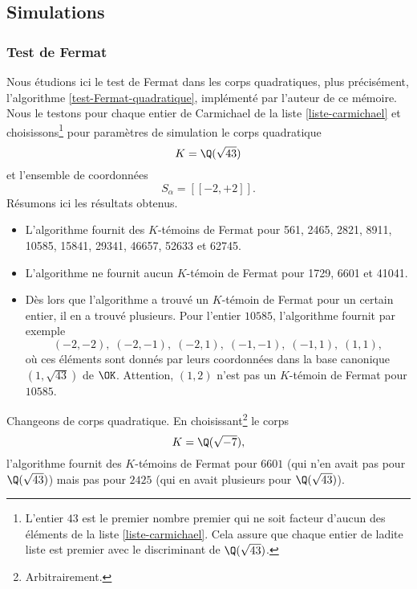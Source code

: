 \subsection{Simulations}

\subsubsection{Test de Fermat}

Nous étudions ici le test de Fermat dans les corps quadratiques, plus précisément, l'algorithme \ref{test-Fermat-quadratique}, implémenté par l'auteur de ce mémoire. Nous le testons pour chaque entier de Carmichael de la liste \ref{liste-carmichael} et choisissons\footnote{L'entier $43$ est le premier nombre premier qui ne soit facteur d'aucun des éléments de la liste \ref{liste-carmichael}. Cela assure que chaque entier de ladite liste est premier avec le discriminant de $\Q(\sqrt{43})$.} pour paramètres de simulation le corps quadratique \[K = \Q(\sqrt{43})\] et l'ensemble de coordonnées \[S_\alpha = [\![-2, +2]\!].\] Résumons ici les résultats obtenus.
\begin{itemize}
	\item L'algorithme fournit des $K$-témoins de Fermat pour 561, 2465, 2821, 8911, 10585, 15841, 29341, 46657, 52633 et 62745.
	\item L'algorithme ne fournit aucun $K$-témoin de Fermat pour 1729, 6601 et 41041.
	\item Dès lors que l'algorithme a trouvé un $K$-témoin de Fermat pour un certain entier, il en a trouvé plusieurs. Pour l'entier $10585$, l'algorithme fournit par exemple \[(-2, -2), \; (-2, -1), \; (-2, 1), \; (-1, -1), \; (-1, 1), \; (1, 1),\] où ces éléments sont donnés par leurs coordonnées dans la base canonique $(1, \sqrt{43})$ de $\OK$. Attention, $(1, 2)$ n'est pas un $K$-témoin de Fermat pour $10585$.
\end{itemize}

Changeons de corps quadratique. En choisissant\footnote{Arbitrairement.} le corps \[K = \Q(\sqrt{-7}),\] l'algorithme fournit des $K$-témoins de Fermat pour $6601$ (qui n'en avait pas pour $\Q(\sqrt{43})$) mais pas pour $2425$ (qui en avait plusieurs pour $\Q(\sqrt{43})$). \\

